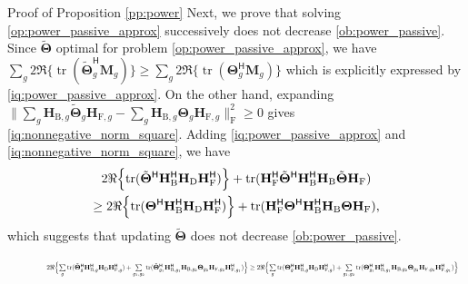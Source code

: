 \documentclass[journal]{IEEEtran}
\DeclareMathOperator{\tr}{tr}
\begin{document}
\begin{appendix}
\begin{subsection}{Proof of Proposition \ref{pp:power}}
		Next, we prove that solving \eqref{op:power_passive_approx} successively does not decrease \eqref{ob:power_passive}.
		Since $\tilde{\mathbf{\Theta}}$ optimal for problem \eqref{op:power_passive_approx}, we have $\sum_g 2 \Re\bigl\{ \tr(\tilde{\mathbf{\Theta}}_g^\mathsf{H} \mathbf{M}_g) \bigr\} \ge \sum_g 2 \Re\bigl\{ \tr(\mathbf{\Theta}_g^\mathsf{H} \mathbf{M}_g) \bigr\}$ which is explicitly expressed by \eqref{iq:power_passive_approx}.
		On the other hand, expanding $\lVert \sum_g \mathbf{H}_{\mathrm{B},g} \tilde{\mathbf{\Theta}}_g \mathbf{H}_{\mathrm{F},g} - \sum_g \mathbf{H}_{\mathrm{B},g} \mathbf{\Theta}_g \mathbf{H}_{\mathrm{F},g} \rVert _\mathrm{F}^2 \ge 0$ gives \eqref{iq:nonnegative_norm_square}.
		Adding \eqref{iq:power_passive_approx} and \eqref{iq:nonnegative_norm_square}, we have
		\begin{multline}
			2 \Re \Bigl\{\tr(\tilde{\mathbf{\Theta}}^\mathsf{H} \mathbf{H}_\mathrm{B}^\mathsf{H} \mathbf{H}_\mathrm{D} \mathbf{H}_\mathrm{F}^\mathsf{H}) \Bigr\} + \tr(\mathbf{H}_\mathrm{F}^\mathsf{H} \tilde{\mathbf{\Theta}}^\mathsf{H} \mathbf{H}_\mathrm{B}^\mathsf{H} \mathbf{H}_\mathrm{B} \tilde{\mathbf{\Theta}} \mathbf{H}_\mathrm{F}) \\
			\ge 2 \Re \Bigl\{\tr({\mathbf{\Theta}}^\mathsf{H} \mathbf{H}_\mathrm{B}^\mathsf{H} \mathbf{H}_\mathrm{D} \mathbf{H}_\mathrm{F}^\mathsf{H}) \Bigr\} + \tr(\mathbf{H}_\mathrm{F}^\mathsf{H} {\mathbf{\Theta}}^\mathsf{H} \mathbf{H}_\mathrm{B}^\mathsf{H} \mathbf{H}_\mathrm{B} {\mathbf{\Theta}} \mathbf{H}_\mathrm{F}),
		\end{multline}
		which suggests that updating $\tilde{\mathbf{\Theta}}$ does not decrease \eqref{ob:power_passive}.
		\begin{figure}
			\begin{equation}
				\label{iq:power_passive_approx}
				\resizebox{0.95\textwidth}{!}{
					$2 \Re \Bigl\{\sum\limits_g \tr(\tilde{\mathbf{\Theta}}_g^\mathsf{H} \mathbf{H}_{\mathrm{B},g}^\mathsf{H} \mathbf{H}_\mathrm{D} \mathbf{H}_{\mathrm{F},g}^\mathsf{H}) + \sum\limits_{g_1,g_2} \tr(\tilde{\mathbf{\Theta}}_{g_1}^\mathsf{H} \mathbf{H}_{\mathrm{B},g_1}^\mathsf{H} \mathbf{H}_{\mathrm{B},g_2} \mathbf{\Theta}_{g_2} \mathbf{H}_{\mathrm{F},g_2} \mathbf{H}_{\mathrm{F},g_1}^\mathsf{H})\Bigr\} \ge 2 \Re \Bigl\{\sum\limits_g \tr({\mathbf{\Theta}}_g^\mathsf{H} \mathbf{H}_{\mathrm{B},g}^\mathsf{H} \mathbf{H}_\mathrm{D} \mathbf{H}_{\mathrm{F},g}^\mathsf{H}) + \sum\limits_{g_1,g_2} \tr({\mathbf{\Theta}}_{g_1}^\mathsf{H} \mathbf{H}_{\mathrm{B},g_1}^\mathsf{H} \mathbf{H}_{\mathrm{B},g_2} \mathbf{\Theta}_{g_2} \mathbf{H}_{\mathrm{F},g_2} \mathbf{H}_{\mathrm{F},g_1}^\mathsf{H})\Bigr\}$
}
\end{equation}
\end{figure}
\end{subsection}
\end{appendix}
\end{document}
